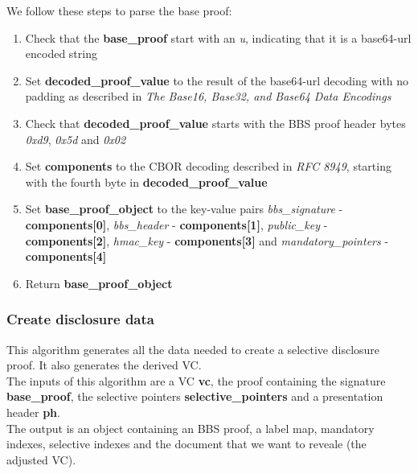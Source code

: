 \documentclass[
	a4paper               %
	,BCOR=0mm            %
	,bibliography=totoc   %
	,listof=totoc         %
	,monolingual
	,twoside=false
]{bfhthesis}              %
\begin{document}
We follow these steps to parse the base proof:
\begin{enumerate}
	\item Check that the \textbf{base\_proof} start with an \textit{u}, indicating that it is a base64-url encoded string
	\item Set \textbf{decoded\_proof\_value} to the result of the base64-url decoding with no padding as described in \textit{The Base16, Base32, and Base64 Data Encodings}\cite{base64}
	\item Check that \textbf{decoded\_proof\_value} starts with the BBS proof header bytes \textit{0xd9}, \textit{0x5d} and \textit{0x02}
	\item Set \textbf{components} to the CBOR decoding described in \textit{RFC 8949}\cite{cbor}, starting with the fourth byte in \textbf{decoded\_proof\_value}
	\item Set \textbf{base\_proof\_object} to the key-value pairs \textit{bbs\_signature} - \textbf{components[0]}, \textit{bbs\_header} - \textbf{components[1]}, \textit{public\_key} - \textbf{components[2]}, \textit{hmac\_key} - \textbf{components[3]} and \textit{mandatory\_pointers} - \textbf{components[4]}
	\item Return \textbf{base\_proof\_object}
\end{enumerate}

\subsubsection{Create disclosure data}
\label{subsub:createdisclosuredata}
This algorithm generates all the data needed to create a selective disclosure proof. It also generates the derived VC.\\

The inputs of this algorithm are a VC \textbf{vc}, the proof containing the signature \textbf{base\_proof}, the selective pointers \textbf{selective\_pointers} and a presentation header \textbf{ph}.\\

The output is an object containing an BBS proof, a label map, mandatory indexes, selective indexes and the document that we want to reveale (the adjusted VC).\\
\end{document}
